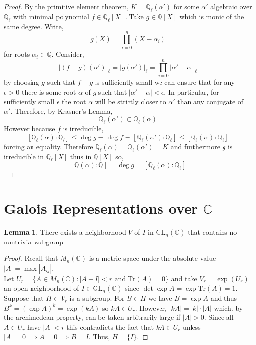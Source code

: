 \documentclass[12pt]{article}
\newcommand{\C}{\mathbb{C}}
\newcommand{\Q}{\mathbb{Q}}
\newcommand{\tr}[1]{\mathrm{Tr} \! \left(#1\right)}
\newcommand{\GL}[2]{\mathrm{GL}_{#1}(#2)}
\theoremstyle{remark}
\theoremstyle{definition}
\newtheorem{lemma}[theorem]{Lemma}
\begin{document}
\begin{proof}
By the primitive element theorem, $K = \Q_{\ell}(\alpha')$ for some $\alpha'$ algebraic over $\Q_{\ell}$ with minimal polynomial $f \in \Q_{\ell}[X]$. Take $g \in \Q[X]$ which is monic of the same degree. Write,
\[ g(X) = \prod_{i = 0}^n (X - \alpha_i) \]
for roots $\alpha_i \in \overline{\Q}$.
Consider,
\[ |(f - g)(\alpha')|_{\ell} = |g(\alpha')|_{\ell} = \prod_{i = 0}^n |\alpha' - \alpha_i|_{\ell} \] 
by choosing $g$ such that $f - g$ is sufficiently small we can ensure that for any $\epsilon > 0$ there is some root $\alpha$ of $g$ such that $|\alpha' - \alpha| < \epsilon$. In particular, for sufficiently small $\epsilon$ the root $\alpha$ will be strictly closer to $\alpha'$ than any conjugate of $\alpha'$. Therefore, by Krasner's Lemma,
\[ \Q_{\ell}(\alpha') \subset \Q_{\ell}(\alpha) \]
However because $f$ is irreducible,
\[ [\Q_{\ell}(\alpha) : \Q_{\ell}] \le \deg{g} = \deg{f} = [\Q_{\ell}(\alpha') : \Q_{\ell}] \le [\Q_{\ell}(\alpha) : \Q_{\ell}]  \]
forcing an equality. Therefore $\Q_{\ell}(\alpha) = \Q_{\ell}(\alpha') = K$ and furthermore $g$ is irreducible in $\Q_{\ell}[X]$ thus in $\Q[X]$ so,
 \[ [\Q(\alpha) : \Q] = \deg{g} = [\Q_{\ell}(\alpha) : \Q_{\ell} ] \]
\end{proof}

\section{Galois Representations over $\C$}


\begin{lemma} \label{lem:no_subgroups_of_nbd}
There exists a neighborhood $V$ of $I$ in $\GL{n}{\C}$ that contains no nontrivial subgroup.
\end{lemma}
\begin{proof}
Recall that $M_n(\C)$ is a metric space under the absolute value $|A| = \max |A_{ij}|$.
\\
Let $U_r = \{A \in M_n(\C) : |A - I| < r \text{ and } \tr{A} = 0 \}$ and take $V_r = \exp(U_r)$ an open neighborhood of $I \in \GL{n}{\C}$ since $\det{\exp{A}} = \exp{\tr{A}} = 1$. Suppose that $H \subset V_r$ is a subgroup. For $B \in H$ we have $B = \exp{A}$ and thus $B^k = (\exp{A})^k = \exp{(kA)}$ so $kA \in U_r$. However, $|k A| = |k| \cdot |A|$ which, by the archimedean property, can be taken arbitrarily large if $|A| > 0$. Since all $A \in U_r$ have $|A| < r$ this contradicts the fact that $k A \in U_r$ unless $|A| = 0 \implies A = 0 \implies B = I$. Thus, $H = \{ I \}$.  
\end{proof}
\end{document}

